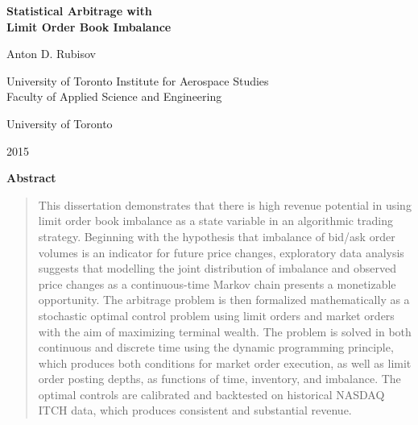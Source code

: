 \vspace*{0.25in}

\begin{center}
	{\Large\bf Statistical Arbitrage with \\ Limit Order Book Imbalance \par}
	{\large Anton D. Rubisov \par}
	{University of Toronto Institute for Aerospace Studies}\\
    {Faculty of Applied Science and Engineering}\\
	{University of Toronto \par}
	{2015}
\end{center}
\vspace{0.25in}	
{\Large\bf Abstract}
\vspace{0.25in}

\begin{quote}
This dissertation demonstrates that there is high revenue potential in using limit order book imbalance as a state variable in an algorithmic trading strategy. Beginning with the hypothesis that imbalance of bid/ask order volumes is an indicator for future price changes, exploratory data analysis suggests that modelling the joint distribution of imbalance and observed price changes as a continuous-time Markov chain presents a monetizable opportunity. The arbitrage problem is then formalized mathematically as a stochastic optimal control problem using limit orders and market orders with the aim of maximizing terminal wealth. The problem is solved in both continuous and discrete time using the dynamic programming principle, which produces both conditions for market order execution, as well as limit order posting depths, as functions of time, inventory, and imbalance. The optimal controls are calibrated and backtested on historical NASDAQ ITCH data, which produces consistent and substantial revenue.
\end{quote}